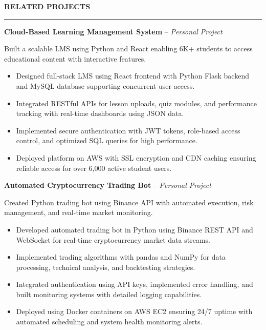 \documentclass[10pt,letterpaper]{article}
\begin{document}
\vspace{6pt}

\textbf{RELATED PROJECTS}\\[-8pt]
\noindent\rule{\textwidth}{1pt}

\vspace{-2pt}

\textbf{Cloud-Based Learning Management System} -- \emph{Personal Project}

\vspace{-1pt}

Built a scalable LMS using Python and React enabling 6K+ students to access educational content with interactive features.
\vspace{-1pt}
\begin{itemize}
\item Designed full-stack LMS using React frontend with Python Flask backend and MySQL database supporting concurrent user access.
\item Integrated RESTful APIs for lesson uploads, quiz modules, and performance tracking with real-time dashboards using JSON data.
\item Implemented secure authentication with JWT tokens, role-based access control, and optimized SQL queries for high performance.
\item Deployed platform on AWS with SSL encryption and CDN caching ensuring reliable access for over 6,000 active student users.
\end{itemize}

\textbf{Automated Cryptocurrency Trading Bot} -- \emph{Personal Project}

\vspace{-1pt}

Created Python trading bot using Binance API with automated execution, risk management, and real-time market monitoring.
\vspace{-1pt}
\begin{itemize}
\item Developed automated trading bot in Python using Binance REST API and WebSocket for real-time cryptocurrency market data streams.
\item Implemented trading algorithms with pandas and NumPy for data processing, technical analysis, and backtesting strategies.
\item Integrated authentication using API keys, implemented error handling, and built monitoring systems with detailed logging capabilities.
\item Deployed using Docker containers on AWS EC2 ensuring 24/7 uptime with automated scheduling and system health monitoring alerts.
\end{itemize}
\end{document}
